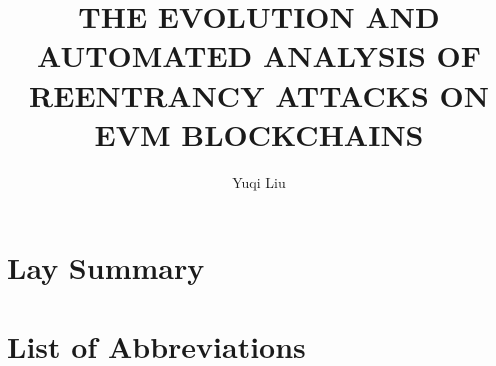 \documentclass[msc,oneside]{ubcthesis}
\title{THE EVOLUTION AND AUTOMATED ANALYSIS OF REENTRANCY ATTACKS ON EVM BLOCKCHAINS}
\author{Yuqi Liu}
\begin{document}
\frontmatter
\maketitle
\clearpage

\thispagestyle{plain}

\clearpage

\begin{abstract}

\end{abstract}

\chapter{Lay Summary}




\tableofcontents
\listoftables
\listoffigures

\chapter{List of Abbreviations}




% 
\end{document}
